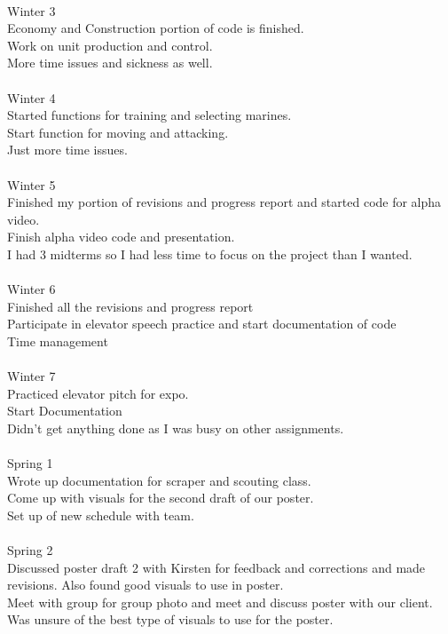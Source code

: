 \\
Winter 3\\
Economy and Construction portion of code is finished.\\ Work on unit production and control.\\ More time issues and sickness as well.\\
\\
Winter 4\\
Started functions for training and selecting marines.\\ Start function for moving and attacking.\\ Just more time issues.\\
\\
Winter 5\\
Finished my portion of revisions and progress report and started code for alpha video.\\ Finish alpha video code and presentation.\\ I had 3 midterms so I had less time to focus on the project than I wanted.\\
\\
Winter 6\\
Finished all the revisions and progress report\\ Participate in elevator speech practice and start documentation of code\\ Time management\\
\\
Winter 7\\
Practiced elevator pitch for expo.\\ Start Documentation\\ Didn't get anything done as I was busy on other assignments.\\
\\
Spring 1\\
Wrote up documentation for scraper and scouting class.\\ Come up with visuals for the second draft of our poster.\\ Set up of new schedule with team.\\
\\
Spring 2\\
Discussed poster draft 2 with Kirsten for feedback and corrections and made revisions. Also found good visuals to use in poster.\\ Meet with group for group photo and meet and discuss poster with our client.\\ Was unsure of the best type of visuals to use for the poster.\\
